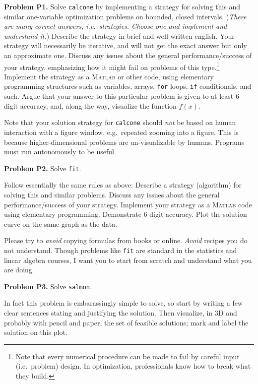 \documentclass[12pt]{amsart}
\newcommand{\Matlab}{\textsc{Matlab}\xspace}
\newcommand{\prob}[1]{\bigskip\noindent\textbf{#1}\quad }
\begin{document}
\medskip
\prob{Problem P1.}  Solve \texttt{calcone} by implementing a strategy for solving this and similar one-variable optimization problems on bounded, closed intervals.  (\emph{There are many correct answers, i.e.~strategies.  Choose one and implement and understand it.})  Describe the strategy in brief and well-written english.  Your strategy will necessarily be iterative, and will not get the exact answer but only an approximate one.  Discuss any issues about the general performance/success of your strategy, emphasizing how it might fail on problems of this type.\footnote{Note that every numerical procedure can be made to fail by careful input (i.e.~problem) design.  In optimization, professionals know how to break what they build.}  Implement the strategy as a \Matlab or other code, using elementary programming structures such as variables, arrays, \texttt{for} loops, \texttt{if} conditionals, and such.  Argue that your answer to this particular problem is given to at least 6-digit accuracy, and, along the way, visualize the function $f(x)$.

Note that your solution strategy for \texttt{calcone} should \emph{not} be based on human interaction with a figure window, e.g.~repeated zooming into a figure.  This is because higher-dimensional problems are un-visualizable by humans.  Programs must run autonomously to be useful.


\prob{Problem P2.}  Solve \texttt{fit}.

Follow essentially the same rules as above: Describe a strategy (algorithm) for solving this and similar problems.  Discuss any issues about the general performance/success of your strategy.  Implement your strategy as a \Matlab code using elementary programming.  Demonstrate 6 digit accuracy.  Plot the solution curve on the same graph as the data.
 
Please try to \emph{avoid} copying formulas from books or online.  \emph{Avoid} recipes you do not understand.  Though problems like \texttt{fit} are standard in the statistics and linear algebra courses, I want you to start from scratch and understand what you are doing.


\prob{Problem P3.}  Solve \texttt{salmon}.

In fact this problem is embarassingly simple to solve, so start by writing a few clear sentences stating and justifying the solution.  Then visualize, in 3D and probably with pencil and paper, the set of feasible solutions; mark and label the solution on this plot.
\end{document}
